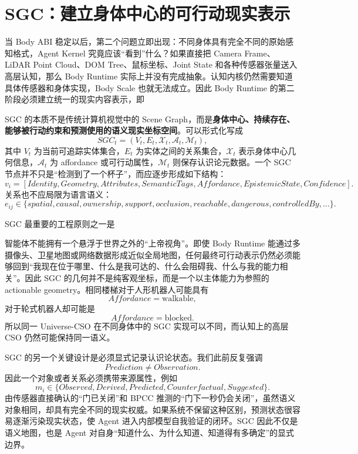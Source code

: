 \section{SGC：建立身体中心的可行动现实表示}

当 Body ABI 稳定以后，第二个问题立即出现：不同身体具有完全不同的原始感知格式，Agent Kernel 究竟应该“看到”什么？如果直接把 Camera Frame、LiDAR Point Cloud、DOM Tree、鼠标坐标、Joint State 和各种传感器张量送入高层认知，那么 Body Runtime 实际上并没有完成抽象。认知内核仍然需要知道具体传感器和身体实现，Body Scale 也就无法成立。因此 Body Runtime 的第二阶段必须建立统一的现实内容表示，即
\begin{statementbox}
\centering
{}
\end{statementbox}

SGC 的本质不是传统计算机视觉中的 Scene Graph，而是\textbf{身体中心、持续存在、能够被行动约束和预测使用的语义现实坐标空间}。可以形式化写成
\[
SGC_t
=
\left(
V_t,
E_t,
\mathcal X_t,
\mathcal A_t,
\mathcal M_t
\right),
\]
其中 $V_t$ 为当前可追踪实体集合，$E_t$ 为实体之间的关系集合，$\mathcal X_t$ 表示身体中心几何信息，$\mathcal A_t$ 为 affordance 或可行动属性，$\mathcal M_t$ 则保存认识论元数据。一个 SGC 节点并不只是“检测到了一个杯子”，而应逐步形成如下结构：
\[
v_i=
\left[
Identity,
Geometry,
Attributes,
SemanticTags,
Affordance,
EpistemicState,
Confidence
\right].
\]
关系也不应局限为语言语义：
\[
e_{ij}
\in
\{
spatial,
causal,
ownership,
support,
occlusion,
reachable,
dangerous,
controlledBy,\ldots
\}.
\]

SGC 最重要的工程原则之一是
\begin{statementbox}
\centering
{}
\end{statementbox}
智能体不能拥有一个悬浮于世界之外的“上帝视角”。即使 Body Runtime 能通过多摄像头、卫星地图或网络数据形成近似全局地图，任何最终可行动表示仍然必须能够回到“我现在位于哪里、什么是我可达的、什么会阻碍我、什么与我的能力相关”。因此 SGC 的几何并不是纯客观坐标，而是一个以主体能力为参照的 actionable geometry。相同楼梯对于人形机器人可能具有
\[
Affordance=\text{walkable},
\]
对于轮式机器人却可能是
\[
Affordance=\text{blocked}.
\]
所以同一 Universe-CSO 在不同身体中的 SGC 实现可以不同，而认知上的高层 CSO 仍然可能保持同一语义。

SGC 的另一个关键设计是必须显式记录认识论状态。我们此前反复强调
\[
Prediction\neq Observation.
\]
因此一个对象或者关系必须携带来源属性，例如
\[
m_i\in
\{
Observed,
Derived,
Predicted,
Counterfactual,
Suggested
\}.
\]
由传感器直接确认的“门已关闭”和 BPCC 推测的“门下一秒仍会关闭”，虽然语义对象相同，却具有完全不同的现实权威。如果系统不保留这种区别，预测状态很容易逐渐污染现实状态，使 Agent 进入内部模型自我验证的闭环。SGC 因此不仅是语义地图，也是 Agent 对自身“知道什么、为什么知道、知道得有多确定”的显式边界。

